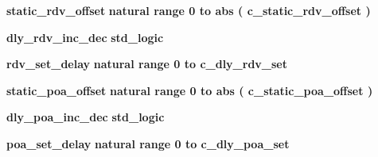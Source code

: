 \begin{DoxyCompactItemize}
\item 
{\bf static\+\_\+rdv\+\_\+offset} {\bfseries \textcolor{comment}{natural}\textcolor{vhdlchar}{ }\textcolor{vhdlchar}{ }\textcolor{vhdlchar}{ }\textcolor{keywordflow}{range}\textcolor{vhdlchar}{ }\textcolor{vhdlchar}{ } \textcolor{vhdldigit}{0} \textcolor{vhdlchar}{ }\textcolor{keywordflow}{to}\textcolor{vhdlchar}{ }\textcolor{keywordflow}{abs}\textcolor{vhdlchar}{ }\textcolor{vhdlchar}{(}\textcolor{vhdlchar}{ }\textcolor{vhdlchar}{ }\textcolor{vhdlchar}{ }\textcolor{vhdlchar}{ }{\bfseries {\bf c\+\_\+static\+\_\+rdv\+\_\+offset}} \textcolor{vhdlchar}{ }\textcolor{vhdlchar}{)}\textcolor{vhdlchar}{ }} 
\item 
{\bf dly\+\_\+rdv\+\_\+inc\+\_\+dec} {\bfseries \textcolor{comment}{std\+\_\+logic}\textcolor{vhdlchar}{ }} 
\item 
{\bf rdv\+\_\+set\+\_\+delay} {\bfseries \textcolor{comment}{natural}\textcolor{vhdlchar}{ }\textcolor{vhdlchar}{ }\textcolor{vhdlchar}{ }\textcolor{keywordflow}{range}\textcolor{vhdlchar}{ }\textcolor{vhdlchar}{ } \textcolor{vhdldigit}{0} \textcolor{vhdlchar}{ }\textcolor{keywordflow}{to}\textcolor{vhdlchar}{ }\textcolor{vhdlchar}{ }\textcolor{vhdlchar}{ }\textcolor{vhdlchar}{ }{\bfseries {\bf c\+\_\+dly\+\_\+rdv\+\_\+set}} \textcolor{vhdlchar}{ }} 
\item 
{\bf static\+\_\+poa\+\_\+offset} {\bfseries \textcolor{comment}{natural}\textcolor{vhdlchar}{ }\textcolor{vhdlchar}{ }\textcolor{vhdlchar}{ }\textcolor{keywordflow}{range}\textcolor{vhdlchar}{ }\textcolor{vhdlchar}{ } \textcolor{vhdldigit}{0} \textcolor{vhdlchar}{ }\textcolor{keywordflow}{to}\textcolor{vhdlchar}{ }\textcolor{keywordflow}{abs}\textcolor{vhdlchar}{ }\textcolor{vhdlchar}{(}\textcolor{vhdlchar}{ }\textcolor{vhdlchar}{ }\textcolor{vhdlchar}{ }\textcolor{vhdlchar}{ }{\bfseries {\bf c\+\_\+static\+\_\+poa\+\_\+offset}} \textcolor{vhdlchar}{ }\textcolor{vhdlchar}{)}\textcolor{vhdlchar}{ }} 
\item 
{\bf dly\+\_\+poa\+\_\+inc\+\_\+dec} {\bfseries \textcolor{comment}{std\+\_\+logic}\textcolor{vhdlchar}{ }} 
\item 
{\bf poa\+\_\+set\+\_\+delay} {\bfseries \textcolor{comment}{natural}\textcolor{vhdlchar}{ }\textcolor{vhdlchar}{ }\textcolor{vhdlchar}{ }\textcolor{keywordflow}{range}\textcolor{vhdlchar}{ }\textcolor{vhdlchar}{ } \textcolor{vhdldigit}{0} \textcolor{vhdlchar}{ }\textcolor{keywordflow}{to}\textcolor{vhdlchar}{ }\textcolor{vhdlchar}{ }\textcolor{vhdlchar}{ }\textcolor{vhdlchar}{ }{\bfseries {\bf c\+\_\+dly\+\_\+poa\+\_\+set}} \textcolor{vhdlchar}{ }} 

\end{DoxyCompactItemize}
